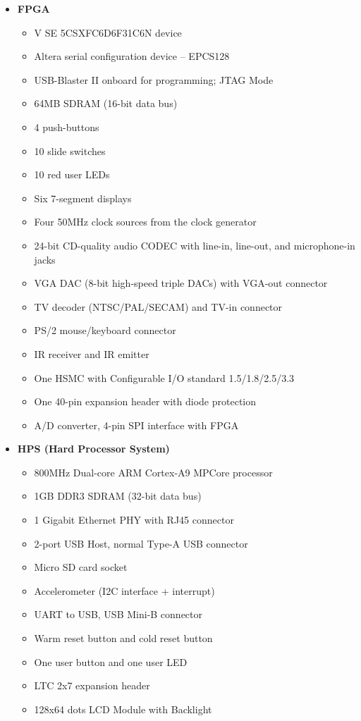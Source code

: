 \begin{itemize}[label=-]
	\item \textbf{FPGA}
		\begin{itemize}[label=+]
			\item {} V SE 5CSXFC6D6F31C6N device
			\item Altera serial configuration device – EPCS128 
			\item USB-Blaster II onboard for programming; JTAG Mode
			\item 64MB SDRAM (16-bit data bus)
			\item 4 push-buttons
			\item 10 slide switches
			\item 10 red user LEDs
			\item Six 7-segment displays
			\item Four 50MHz clock sources from the clock generator
			\item 24-bit CD-quality audio CODEC with line-in, line-out, and microphone-in jacks
			\item VGA DAC (8-bit high-speed triple DACs) with VGA-out connector
			\item TV decoder (NTSC/PAL/SECAM) and TV-in connector
			\item PS/2 mouse/keyboard connector
			\item IR receiver and IR emitter
			\item One HSMC with Configurable I/O standard 1.5/1.8/2.5/3.3
			\item One 40-pin expansion header with diode protection
			\item A/D converter, 4-pin SPI interface with FPGA
		\end{itemize}
	\item \textbf{HPS (Hard Processor System)}
		\begin{itemize}[label=+]
			\item 800MHz Dual-core ARM Cortex-A9 MPCore processor
			\item 1GB DDR3 SDRAM (32-bit data bus)
			\item 1 Gigabit Ethernet PHY with RJ45 connector
			\item 2-port USB Host, normal Type-A USB connector
			\item Micro SD card socket
			\item Accelerometer (I2C interface + interrupt)
			\item UART to USB, USB Mini-B connector
			\item Warm reset button and cold reset button
			\item One user button and one user LED
			\item LTC 2x7 expansion header
			\item 128x64 dots LCD Module with Backlight
		\end{itemize}
\end{itemize}

